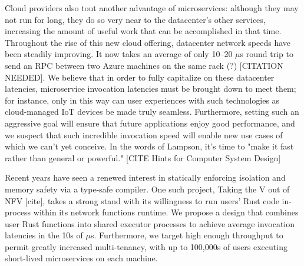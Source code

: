 Cloud providers also tout another advantage of microservices: although they may not run for long, they do so very near to the datacenter's other services, increasing the amount of useful work that can be accomplished in that time.
Throughout the rise of this new cloud offering, datacenter network speeds have been steadily improving.
It now takes an average of only 10--20 $\mu$s round trip to send an RPC between two Azure machines on the same rack (?) [CITATION NEEDED].
We believe that in order to fully capitalize on these datacenter latencies, microservice invocation latencies must be brought down to meet them; for instance, only in this way can user experiences with such technologies as cloud-managed IoT devices be made truly seamless.
Furthermore, setting such an aggressive goal will ensure that future applications enjoy good performance, and we suspect that such incredible invocation speed will enable new use cases of which we can't yet conceive.
In the words of Lampson, it's time to "make it fast rather than general or powerful." [CITE Hints for Computer System Design]

Recent years have seen a renewed interest in statically enforcing isolation and memory safety via a type-safe compiler.
One such project, Taking the V out of NFV [cite], takes a strong stand with its willingness to run users' Rust code in-process within its network functions runtime.
We propose a design that combines user Rust functions into shared executor processes to achieve average invocation latencies in the 10s of $\mu$s.
Furthermore, we target high enough throughput to permit greatly increased multi-tenancy, with up to 100,000s of users executing short-lived microservices on each machine.
